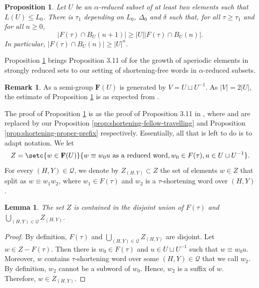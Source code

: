 \documentclass[leqno,a4paper,10pt]{amsart}
\theoremstyle{plain}
\newtheorem{prop}[thm]{Proposition}
\newtheorem{lem}[thm]{Lemma}
\theoremstyle{definition}
\newtheorem{rem}[thm]{Remark}
\theoremstyle{remark}
\renewcommand{\leq}{\leqslant}
\newcommand{\F}{\mathbf{F}}
\newcommand{\scrQ}{\mathscr{Q}}
\let\ge\geqslant
\let\leq\leqslant
\begin{document}
\begin{prop}
	\label{prop:growth shortening-free}
	Let $U$ be an $\alpha$-reduced subset of at least two elements such that $L(U)\leq L_0$. There is $\tau_1$ depending on $L_0$, $\Delta_0$ and $\delta$ such that, for all $\tau\ge \tau_1$ and for all $n\ge 0$, 
	$$|F(\tau)\cap B_U(n+1)|\ge |U||F(\tau)\cap B_U(n)|.$$
	In particular, $|F(\tau)\cap B_U(n)|\ge |U|^n .$
\end{prop}

Proposition \ref{prop:growth shortening-free} brings Proposition 3.11 of \cite{coulon_product_2022} for the growth of aperiodic elements in strongly reduced sets to our setting of shortening-free words in $\alpha$-reduced subsets. 

\begin{rem} As a semi-group $\F(U)$ is generated by $V=U\sqcup U^{-1}$. As $|V|=2|U|$, the estimate of Proposition \ref{prop:growth shortening-free} is as expected from \cite[Proposition 3.11]{coulon_product_2022}.
\end{rem}

The proof of Proposition \ref{prop:growth shortening-free} is as the proof of Proposition 3.11 in \cite{coulon_product_2022}, where \cite[Proposition 3.6]{coulon_product_2022}  and \cite[Proposition 3.8]{coulon_product_2022} are replaced by our Proposition \ref{prop:shortening-fellow-travelling} and Proposition \ref{prop:shortening-proper-prefix} respectively. Essentially, all that is left to do is to adapt notation.
 We let 
$$Z=\setc{w\in \F(U)}{w\equiv w_0u\text{ as a reduced word}, w_0\in F(\tau),u\in U\sqcup U^{-1}}.$$
For every $(H,Y)\in \scrQ$, we denote by $Z_{(H,Y)}\subset Z$ the set of elements $w\in Z$ that split as $w\equiv w_1w_2$, where $w_1\in F(\tau)$ and $w_2$ is a $\tau$-shortening word over $(H,Y)$.

\begin{lem}
	\label{lem:growth shortening-free 1}	
	The set $Z$ is contained in the disjoint union of $F(\tau)$ and $\bigcup_{(H,Y)\in\scrQ}Z_{(H,Y)}.$
\end{lem}

\begin{proof}
	By definition, $F(\tau)$ and $\bigcup_{(H,Y)\in\scrQ}Z_{(H,Y)}$ are disjoint. Let $w\in Z-F(\tau)$. Then there is $w_0\in F(\tau)$ and $u\in U\sqcup U^{-1}$ such that $w\equiv w_0u$. Moreover, $w$ contains $\tau$-shortening word over some $(H,Y)\in \scrQ$ that we call $w_2$. By definition, $w_2$ cannot be a subword of $w_0$. Hence, $w_2$ is a suffix of $w$. Therefore, $w\in Z_{(H,Y)}$.
\end{proof}
\end{document}
